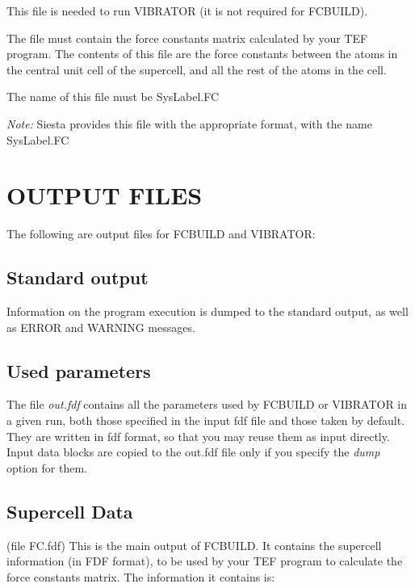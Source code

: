 \noindent
This file is needed to run VIBRATOR (it is not required for
FCBUILD).  

\noindent
The file must contain the force constants matrix calculated
by your TEF program. The contents of this file
are the force constants between the atoms in the central
unit cell of the supercell, and all the rest of the
atoms in the cell. 

\noindent
The name of this file must be SysLabel.FC

\noindent
{\it Note:} Siesta provides this file with the appropriate
format, with the name SysLabel.FC

\section{OUTPUT FILES}

The following are output files for FCBUILD and VIBRATOR:

\subsection{Standard output}
Information on the program execution is dumped to the standard
output, as well as ERROR and WARNING messages.


\subsection{Used parameters}
The file {\it out.fdf} contains all the parameters used by FCBUILD
or VIBRATOR
in a given run, both those specified in the input fdf file and
those taken by default. They are written in fdf format, so that
you may reuse them as input directly. Input data blocks are 
copied to the out.fdf file only if you specify the {\it dump} option
for them.

\subsection{Supercell Data}
(file FC.fdf)
This is the main output of FCBUILD. It contains the supercell
information (in FDF format), to be used by your TEF program
to calculate the force constants matrix.
The information it contains is:

